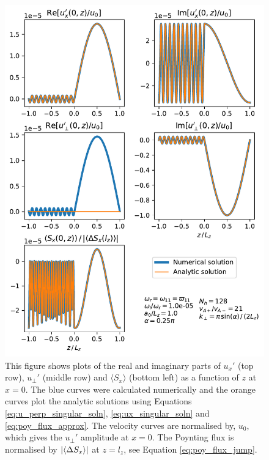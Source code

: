 \documentclass[linenumbers]{aastex63}
\begin{document}
\begin{figure}
    \centering
    \includegraphics[width=17cm,height=0.91\textheight,keepaspectratio]{along_z.pdf}
    \caption{This figure shows plots of the real and imaginary parts of $u_x'$ (top row), $u_\perp'$ (middle row) and $\langle S_x \rangle$ (bottom left) as a function of $z$ at $x=0$. The blue curves were calculated numerically and the orange curves plot the analytic solutions using Equations \eqref{eq:u_perp_singular_soln}, \eqref{eq:ux_singular_soln} and \eqref{eq:poy_flux_approx}. The velocity curves are normalised by, $u_0$, which gives the $u_\perp'$ amplitude at $x=0$. The Poynting flux is normalised by $\abs{\langle \Delta S_x \rangle}$ at $z=l_z$, see Equation \eqref{eq:poy_flux_jump}.}
    \label{fig:along_z}
\end{figure}
\end{document}
